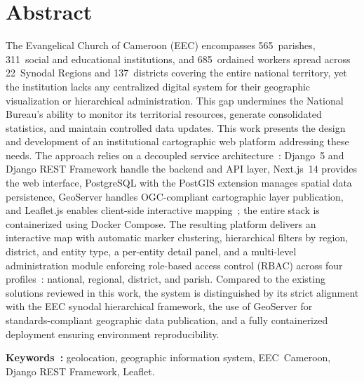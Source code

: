 \documentclass[12pt, a4paper]{report}
\begin{document}
\vspace{0.8cm}
\noindent{\color{eecgreen}\rule{\linewidth}{0.8pt}}
\vspace{0.3cm}

\chapter*{Abstract}

\noindent
The Evangelical Church of Cameroon (EEC) encompasses 565~parishes,
311~social and educational institutions, and 685~ordained workers spread across
22~Synodal Regions and 137~districts covering the entire national territory,
yet the institution lacks any centralized digital system for their geographic
visualization or hierarchical administration. This gap undermines the National
Bureau's ability to monitor its territorial resources, generate consolidated
statistics, and maintain controlled data updates. This work presents the design
and development of an institutional cartographic web platform addressing these
needs. The approach relies on a decoupled service architecture~: Django~5 and
Django REST Framework handle the backend and API layer, Next.js~14 provides the
web interface, PostgreSQL with the PostGIS extension manages spatial data
persistence, GeoServer handles OGC-compliant cartographic layer publication, and
Leaflet.js enables client-side interactive mapping~; the entire stack is
containerized using Docker Compose. The resulting platform delivers an
interactive map with automatic marker clustering, hierarchical filters by region,
district, and entity type, a per-entity detail panel, and a multi-level
administration module enforcing role-based access control (RBAC) across four
profiles~: national, regional, district, and parish. Compared to the existing
solutions reviewed in this work, the system is distinguished by its strict
alignment with the EEC synodal hierarchical framework, the use of GeoServer for
standards-compliant geographic data publication, and a fully containerized
deployment ensuring environment reproducibility.

\smallskip
\noindent\textbf{Keywords~:}
geolocation, geographic information system, EEC~Cameroon,
Django REST Framework, Leaflet.

\clearpage

\end{document}
